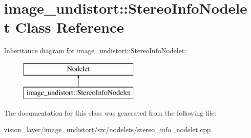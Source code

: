 \hypertarget{classimage__undistort_1_1StereoInfoNodelet}{}\section{image\+\_\+undistort\+:\+:Stereo\+Info\+Nodelet Class Reference}
\label{classimage__undistort_1_1StereoInfoNodelet}
Inheritance diagram for image\+\_\+undistort\+:\+:Stereo\+Info\+Nodelet\+:\begin{figure}[H]
\begin{center}
\leavevmode
\includegraphics[height=2.000000cm]{classimage__undistort_1_1StereoInfoNodelet}
\end{center}
\end{figure}


The documentation for this class was generated from the following file\+:\begin{DoxyCompactItemize}
\item 
vision\+\_\+layer/image\+\_\+undistort/src/nodelets/stereo\+\_\+info\+\_\+nodelet.\+cpp\end{DoxyCompactItemize}
